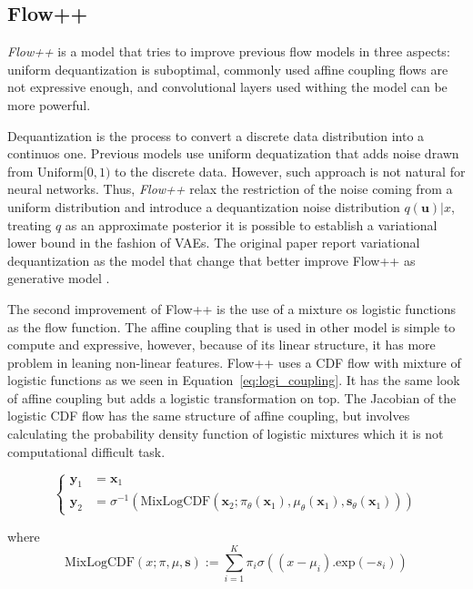 \documentclass{article}
\begin{document}
\subsection{Flow++}

\textit{Flow++} is a model that tries to improve previous flow models in three aspects: uniform dequantization is suboptimal, commonly used affine coupling flows are not expressive enough, and convolutional layers used withing the model can be more powerful. 

Dequantization is the process to convert a discrete data distribution into a continuos one. Previous models use uniform dequatization that adds noise drawn from $\text{Uniform}[0, 1)$ to the discrete data. However, such approach is not natural for neural networks. Thus, \textit{Flow++} relax the restriction of the noise coming from a uniform distribution and introduce a dequantization noise distribution $q(\boldsymbol{u})|x$, treating $q$ as an approximate posterior it is possible to establish a variational lower bound in the fashion of VAEs. The original paper report variational dequantization as the model that change that better improve Flow++ as generative model \cite{ho2019flow++}.

The second improvement of Flow++ is the use of a mixture os logistic functions as the flow function. The affine coupling that is used in other model is simple to compute and expressive, however, because of its linear structure, it has more problem in leaning non-linear features. Flow++ uses a CDF flow with mixture of logistic functions as we seen in Equation~\ref{eq:logi_coupling}. It has the same look of affine coupling but adds a logistic transformation on top. The Jacobian of the logistic CDF flow has the same structure of affine coupling, but involves calculating the probability density function of logistic mixtures which it is not computational difficult task. 

\begin{equation}\label{eq:logi_coupling}
\left\{\begin{matrix}
\textbf{y}_1 &= \textbf{x}_1 \\ 
\textbf{y}_2 &= \sigma^{-1}(\textrm{MixLogCDF}(\textbf{x}_2;\pi_{\theta}(\textbf{x}_1),\mu_{\theta}(\textbf{x}_1),\textbf{s}_{\theta}(\textbf{x}_1)))
\end{matrix}\right.
\end{equation}

where 
  $$\textrm{MixLogCDF}(x;\pi, \mu, \textbf{s}) := \sum_{i=1}^{K}\pi_i\sigma((x - \mu_i).\textrm{exp}(-s_i))$$
\end{document}
